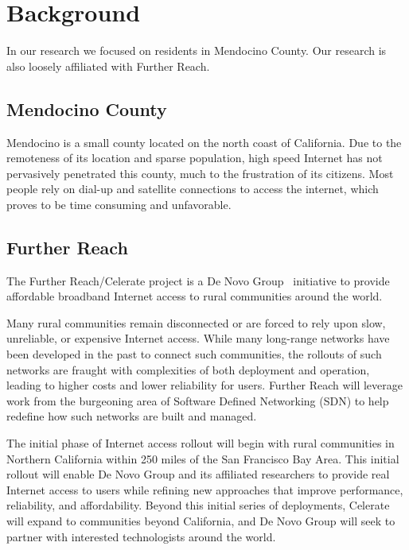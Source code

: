 
\section{Background}
\label{sec:background}
In our research we focused on residents in Mendocino County. Our research is
also
loosely affiliated with Further Reach.

\subsection{Mendocino County}
\label{sec:mendocino-county}

Mendocino is a small county located on the north coast of California. Due to
the remoteness of its location and sparse population, high speed Internet has
not pervasively penetrated this county, much to the frustration of its citizens.
Most people rely on dial-up and satellite connections to access the internet, which proves to be time consuming and unfavorable.


\subsection{Further Reach}
\label{sec:further-reach}


The Further Reach/Celerate project is a De Novo Group~\cite{denovo} initiative
to provide affordable broadband Internet access to rural communities around the
world.

Many rural communities remain disconnected or are forced to rely upon slow,
unreliable, or expensive Internet access. While many long-range networks have
been developed in the past to connect such communities, the rollouts of such
networks are fraught with complexities of both deployment and operation, leading
to higher costs and lower reliability for users. Further Reach will leverage work
from the burgeoning area of Software Defined Networking (SDN) to help redefine
how such networks are built and managed.

The initial phase of Internet access rollout will begin with rural communities
in Northern California within 250 miles of the San Francisco Bay Area. This
initial rollout will enable De Novo Group and its affiliated researchers to
provide real Internet access to users while refining new approaches that improve
performance, reliability, and affordability. Beyond this initial series of
deployments, Celerate will expand to communities beyond California, and De Novo
Group will seek to partner with interested technologists around the world.

